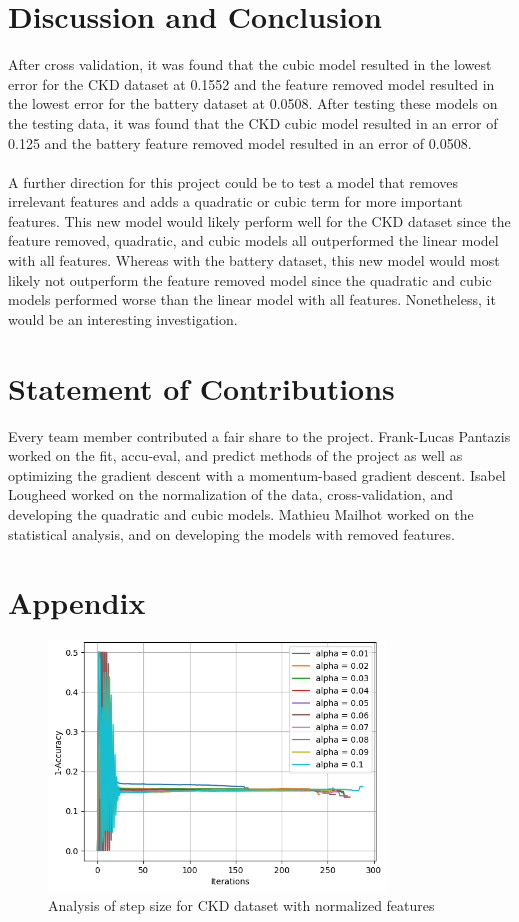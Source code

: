 \documentclass{article}
\begin{document}
\section{Discussion and Conclusion}

After cross validation, it was found that the cubic model resulted in the lowest error for the CKD dataset at 0.1552 and the feature removed model resulted in the lowest error for the battery dataset at 0.0508.  After testing these models on the testing data, it was found that the CKD cubic model resulted in an error of 0.125 and the battery feature removed model resulted in an error of 0.0508. 
\\
\\
A further direction for this project could be to test a model that removes irrelevant features and adds a quadratic or cubic term for more important features.  This new model would likely perform well for the CKD dataset since the feature removed, quadratic, and cubic models all outperformed the linear model with all features.  Whereas with the battery dataset, this new model would most likely not outperform the feature removed model since the quadratic and cubic models performed worse than the linear model with all features.  Nonetheless, it would be an interesting investigation. 

\section{Statement of Contributions}

Every team member contributed a fair share to the project. Frank-Lucas Pantazis worked on the fit, accu-eval, and predict methods of the project as well as optimizing the gradient descent with a momentum-based gradient descent. Isabel Lougheed worked on the normalization of the data, cross-validation, and developing the quadratic and cubic models. Mathieu Mailhot worked on the statistical analysis, and on developing the models with removed features. 

\section{Appendix}

\begin{figure}[H]
  \centering
  \includegraphics[width=0.8\textwidth]{CKDmodel1.png}
  \caption{Analysis of step size for CKD dataset with normalized features}
  \label{fig:quad_ckd}
\end{figure}
\end{document}
